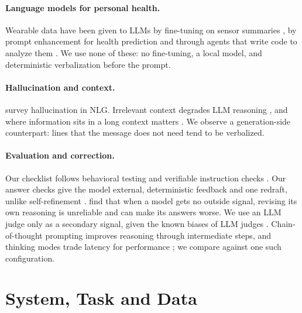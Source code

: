 \documentclass[10pt,twocolumn]{article}
\begin{document}
\paragraph{Language models for personal health.} Wearable data have been given to LLMs by fine-tuning on sensor summaries
\citep{cosentino2024personal}, by prompt enhancement for health prediction \citep{kim2024healthllm} and through agents that write
code to analyze them \citep{merrill2024transforming}. We use none of these: no fine-tuning, a local model, and deterministic
verbalization before the prompt.

\paragraph{Hallucination and context.} \citet{ji2023survey} survey hallucination in NLG. Irrelevant context degrades
LLM reasoning \citep{shi2023distracted}, and where information sits in a long context matters
\citep{liu2024lost}. We observe a generation-side counterpart: lines that the message does not need tend to be
verbalized.

\paragraph{Evaluation and correction.} Our checklist follows behavioral testing \citep{ribeiro2020checklist} and
verifiable instruction checks \citep{zhou2023ifeval}. Our answer checks give the model external, deterministic
feedback and one redraft, unlike self-refinement \citep{madaan2023selfrefine}. \citet{huang2024cannot} find that
when a model gets no outside signal, revising its own reasoning is unreliable and can make its answers worse. We use an LLM judge only as a secondary signal, given the
known biases of LLM judges \citep{zheng2023judging}. Chain-of-thought prompting \citep{wei2022chain} improves
reasoning through intermediate steps, and thinking modes trade latency for performance \citep{qwen3}; we compare
against one such configuration.

\section{System, Task and Data}
\label{sec:system}
\end{document}
